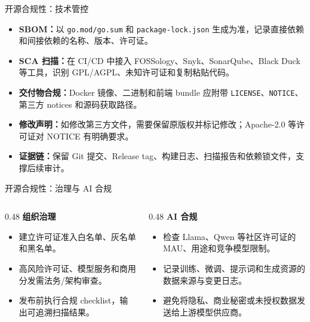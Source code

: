 \documentclass[aspectratio=169,UTF8]{ctexbeamer}
\newcommand{\code}[1]{\texttt{#1}}
\begin{document}
\begin{frame}{开源合规性：技术管控}
  \begin{itemize}
    \item \textbf{SBOM：}以 \code{go.mod/go.sum} 和 \code{package-lock.json} 生成为准，记录直接依赖和间接依赖的名称、版本、许可证。
    \item \textbf{SCA 扫描：}在 CI/CD 中接入 FOSSology、Snyk、SonarQube、Black Duck 等工具，识别 GPL/AGPL、未知许可证和复制粘贴代码。
    \item \textbf{交付物合规：}Docker 镜像、二进制和前端 bundle 应附带 \code{LICENSE}、\code{NOTICE}、第三方 notices 和源码获取路径。
    \item \textbf{修改声明：}如修改第三方文件，需要保留原版权并标记修改；Apache-2.0 等许可证对 NOTICE 有明确要求。
    \item \textbf{证据链：}保留 Git 提交、Release tag、构建日志、扫描报告和依赖锁文件，支撑后续审计。
  \end{itemize}
\end{frame}

\begin{frame}{开源合规性：治理与 AI 合规}
  \begin{columns}[T]
    \begin{column}{0.48\linewidth}
      \textbf{组织治理}
      \begin{itemize}
        \item 建立许可证准入白名单、灰名单和黑名单。
        \item 高风险许可证、模型服务和商用分发需法务/架构审查。
        \item 发布前执行合规 checklist，输出可追溯扫描结果。
      \end{itemize}
    \end{column}
    \begin{column}{0.48\linewidth}
      \textbf{AI 合规}
      \begin{itemize}
        \item 检查 Llama、Qwen 等社区许可证的 MAU、用途和竞争模型限制。
        \item 记录训练、微调、提示词和生成资源的数据来源与变更日志。
        \item 避免将隐私、商业秘密或未授权数据发送给上游模型供应商。
      \end{itemize}
    \end{column}
  \end{columns}
\end{frame}
\end{document}
